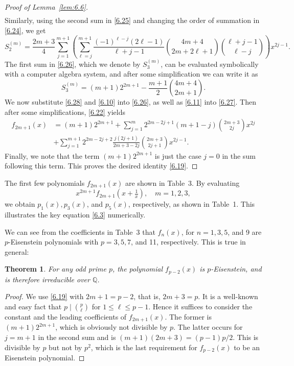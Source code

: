 \documentclass{amsart}
\theoremstyle{plain}
\newtheorem{theorem}{Theorem}[section]
\numberwithin{equation}{section}
\begin{document}
\begin{proof}[Proof of Lemma~\ref{lem:6.6}]
\begin{align}
\end{align}
Similarly, using the second sum in \eqref{6.25} and changing the order of
summation in \eqref{6.24}, we get
\begin{equation}\label{6.27}
S_2^{(m)}=\frac{2m+3}{4}\sum_{j=1}^{m+1}\left(
\sum_{\ell=j}^{m+1}\frac{(-1)^{\ell-j}(2\ell-1)}{\ell+j-1}
\binom{4m+4}{2m+2\ell+1}\binom{\ell+j-1}{\ell-j}\right)x^{2j-1}.
\end{equation}
The first sum in \eqref{6.26}, which we denote by $S_3^{(m)}$, can be evaluated 
symbolically with a computer algebra system, and after some simplification 
we can write it as
\begin{equation}\label{6.28}
S_3^{(m)}=(m+1)2^{2m+1}-\frac{m+1}{2}\binom{4m+4}{2m+1}.
\end{equation}
We now substitute \eqref{6.28} and \eqref{6.10} into \eqref{6.26}, as well as
\eqref{6.11} into \eqref{6.27}. Then after some simplifications, \eqref{6.22}
yields
\begin{align*}
f_{2m+1}(x)&=(m+1)2^{2m+1}
+\sum_{j=1}^m 2^{2m-2j+1}(m+1-j)\binom{2m+3}{2j}x^{2j}\\
&+\sum_{j=1}^{m+1} 2^{2m-2j+2}\frac{j(2j+1)}{2m+3-2j}\binom{2m+3}{2j+1}x^{2j-1}.
\end{align*}
Finally, we note that the term $(m+1)2^{2m+1}$ is just the case $j=0$ in the
sum following this term. This proves the desired identity \eqref{6.19}.
\end{proof}

The first few polynomials $f_{2m+1}(x)$ are shown in Table~3. By evaluating
\[
x^{2m+1}f_{2m+1}(x+\tfrac{1}{x}),\quad m=1, 2, 3,
\]
we obtain $p_1(x), p_3(x)$, and $p_5(x)$, respectively, as shown in Table~1.
This illustrates the key equation \eqref{6.3} numerically.

We can see from the coefficients in Table~3 that $f_n(x)$, for 
$n=1, 3, 5$, and 9 are $p$-Eisenstein polynomials with $p=3, 5, 7$, and 11,
respectively. This is true in general:

\begin{theorem}\label{thm:6.7}
For any odd prime $p$, the polynomial $f_{p-2}(x)$ is $p$-Eisenstein, and is
therefore irreducible over $\mathbb Q$.
\end{theorem}

\begin{proof}
We use \eqref{6.19} with $2m+1=p-2$, that is, $2m+3=p$. It is a well-known
and easy fact that $p\mid\binom{p}{\ell}$ for $1\leq\ell\leq p-1$. Hence it 
suffices to consider the constant and the leading coefficients of $f_{2m+1}(x)$.
The former is $(m+1)2^{2m+1}$, which is obviously not divisible by $p$. The 
latter occurs for $j=m+1$ in the second sum and is $(m+1)(2m+3)=(p-1)p/2$.
This is divisible by $p$ but not by $p^2$, which is the last requirement for
$f_{p-2}(x)$ to be an Eisenstein polynomial.
\end{proof}
\end{document}
